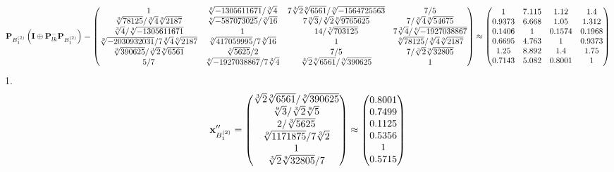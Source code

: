 \documentclass[10pt,a4paper]{article}
\begin{document}
	\[
		\bold{P}_{B_1^{(2)}}\left(\bold{I} \oplus \bold{P}_{lk}^{-}\bold{P}_{B_1^{(2)}}\right) = 
		\begin{pmatrix}
			{1}{} & {\sqrt[9]{-1305611671}} / {\sqrt[3]{4}} & {{7}\sqrt[3]{2}\sqrt[9]{6561}} / {\sqrt[9]{-1564725563}} & {{7}} / {{5}} \\
			{\sqrt[9]{78125}} / {\sqrt[3]{4}\sqrt[9]{2187}} & {\sqrt[9]{-587073025}} / {\sqrt[3]{16}} & {{7}\sqrt[9]{3}} / {\sqrt[3]{2}\sqrt[9]{9765625}} & {{7}} / {\sqrt[3]{4}\sqrt[9]{54675}} \\
			{\sqrt[3]{4}} / {\sqrt[9]{-1305611671}} & {1}{} & {{14}} / {\sqrt[3]{703125}} & {{7}\sqrt[3]{4}} / {\sqrt[9]{-1927038867}} \\
			{\sqrt[9]{-2030932031}} / {{7}\sqrt[3]{4}\sqrt[9]{2187}} & {\sqrt[9]{417059995}} / {{7}\sqrt[3]{16}} & {1}{} & {\sqrt[9]{78125}} / {\sqrt[3]{4}\sqrt[9]{2187}} \\
			{\sqrt[9]{390625}} / {\sqrt[3]{2}\sqrt[9]{6561}} & {\sqrt[3]{5625}} / {{2}} & {{7}} / {{5}} & {{7}} / {\sqrt[3]{2}\sqrt[9]{32805}} \\
			{{5}} / {{7}} & {\sqrt[9]{-1927038867}} / {{7}\sqrt[3]{4}} & {\sqrt[3]{2}\sqrt[9]{6561}} / {\sqrt[9]{390625}} & {1}{} \\
		\end{pmatrix}
		\approx
		\begin{pmatrix}
			1        & 7.115    & 1.12     & 1.4      \\
			0.9373   & 6.668    & 1.05     & 1.312    \\
			0.1406   & 1        & 0.1574   & 0.1968   \\
			0.6695   & 4.763    & 1        & 0.9373   \\
			1.25     & 8.892    & 1.4      & 1.75     \\
			0.7143   & 5.082    & 0.8001   & 1        \\
		\end{pmatrix}
	\]
	1.
	\[
		\bold{x}''_{B_1^{(2)}} = 
		\begin{pmatrix}
			{\sqrt[3]{2}\sqrt[9]{6561}} / {\sqrt[9]{390625}} \\
			{\sqrt[9]{3}} / {\sqrt[3]{2}\sqrt[9]{5}} \\
			{{2}} / {\sqrt[3]{5625}} \\
			{\sqrt[9]{1171875}} / {{7}\sqrt[3]{2}} \\
			{1}{} \\
			{\sqrt[3]{2}\sqrt[9]{32805}} / {{7}} \\
		\end{pmatrix}
		\approx
		\begin{pmatrix}
			0.8001   \\
			0.7499   \\
			0.1125   \\
			0.5356   \\
			1        \\
			0.5715   \\
		\end{pmatrix}
	\]
\end{document}
